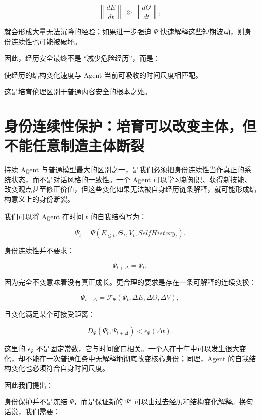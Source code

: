 \[
\left\|\frac{dE}{dt}\right\|
\gg
\left\|\frac{d\Theta}{dt}\right\|,
\]

就会形成大量无法沉降的经验；如果进一步强迫 $\Psi$ 快速解释这些短期波动，则身份连续性也可能被破坏。

因此，经历安全最终不是 ``减少危险经历''，而是：

\begin{statementbox}
使经历的结构变化速度与 Agent 当前可吸收的时间尺度相匹配。
\end{statementbox}

这是培育伦理区别于普通内容安全的根本之处。

\section{身份连续性保护：培育可以改变主体，但不能任意制造主体断裂}

持续 Agent 与普通模型最大的区别之一，是我们必须把身份连续性当作真正的系统状态，而不是对话风格的一致性。一个 Agent 可以学习新知识、获得新技能、改变观点甚至修正价值，但这些变化如果无法被自身经历链条解释，就可能形成结构意义上的身份断裂。

我们可以将 Agent 在时间 $t$ 的自我结构写为：

\[
\Psi_t
=
\Psi(
E_{\leq t},
\Theta_t,
V_t,
SelfHistory_t
).
\]

身份连续性并不要求：

\[
\Psi_{t+\Delta}
=
\Psi_t,
\]

因为完全不变意味着没有真正成长。更合理的要求是存在一条可解释的连续变换：

\[
\Psi_{t+\Delta}
=
\mathcal F_\Psi(
\Psi_t,
\Delta E,
\Delta\Theta,
\Delta V
),
\]

且变化满足某个可接受距离：

\[
D_\Psi(
\Psi_t,
\Psi_{t+\Delta}
)
<
\epsilon_\Psi(\Delta t).
\]

这里的 $\epsilon_\Psi$ 不是固定常数，它与时间窗口相关。一个人在十年中可以发生很大变化，却不能在一次普通任务中无解释地彻底改变核心身份；同理，Agent 的自我结构变化也必须符合自身时间尺度。

因此我们提出：

\begin{statementbox}
\centering
{}
\end{statementbox}

身份保护并不是冻结 $\Psi$，而是保证新的 $\Psi'$ 可以由过去经历和结构变化解释。换句话说，我们需要：

